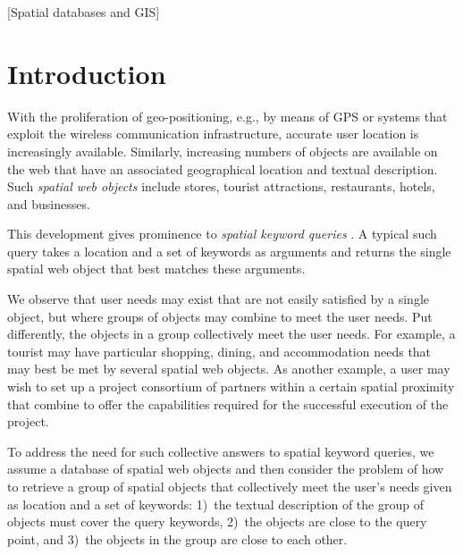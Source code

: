 \documentclass{sig-alternate}
\newcounter{example}[section]
\begin{document}
[Spatial
databases and GIS] %

\vspace{-2mm}


\vspace{-2mm}

\section{Introduction}

With the proliferation of geo-positioning, e.g., by means of GPS or
systems that exploit the wireless communication infrastructure,
accurate user location is increasingly available. Similarly,
increasing numbers of objects are available on the web that have an
associated geographical location and textual description. Such
\emph{spatial web objects} include stores, tourist attractions,
restaurants, hotels, and businesses.

This development gives prominence to \emph{spatial keyword
  queries} \cite{chen06,vldb09,Felipe08,CaoCJ10}. A typical such
query takes a location and a set of keywords as arguments and
returns the single spatial web object that best matches these
arguments.

We observe that user needs may exist that are not easily satisfied
by a single object, but where groups of objects may combine to meet
the user needs. Put differently, the objects in a group collectively
meet the user needs.
%
For example, a tourist may have particular shopping, dining, and
accommodation needs that may best be met by several spatial web
objects.
%
As another example, a user may wish to set up a project consortium
of partners within a certain spatial proximity that combine to offer
the capabilities required for the successful execution of the
project.

To address the need for such collective answers to spatial keyword
queries, we assume a database of spatial web objects and then
consider the problem of how to retrieve a group of spatial objects
that collectively meet the user's needs given as location and a set
of keywords: 1)~the textual description of the group of objects must
cover the query keywords, 2)~the objects are close to the query
point, and 3)~the objects in the group are close to each other.
\end{document}
